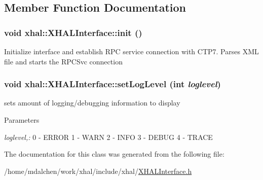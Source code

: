 \subsection{Member Function Documentation}
\hypertarget{classxhal_1_1XHALInterface_a37d127d6a407b73b9746de85d2bf5232}{
\subsubsection[{init}]{\setlength{\rightskip}{0pt plus 5cm}void xhal::XHALInterface::init ()}}
\label{classxhal_1_1XHALInterface_a37d127d6a407b73b9746de85d2bf5232}


Initialize interface and establish RPC service connection with CTP7. Parses XML file and starts the RPCSvc connection \hypertarget{classxhal_1_1XHALInterface_af04487e30a68e8d479d8ae2ad7d0fc81}{
\subsubsection[{setLogLevel}]{\setlength{\rightskip}{0pt plus 5cm}void xhal::XHALInterface::setLogLevel (int {\em loglevel})}}
\label{classxhal_1_1XHALInterface_af04487e30a68e8d479d8ae2ad7d0fc81}


sets amount of logging/debugging information to display 
\begin{DoxyParams}{Parameters}
\item[{\em loglevel,:}]0 -\/ ERROR 1 -\/ WARN 2 -\/ INFO 3 -\/ DEBUG 4 -\/ TRACE \end{DoxyParams}


The documentation for this class was generated from the following file:\begin{DoxyCompactItemize}
\item 
/home/mdalchen/work/xhal/include/xhal/\hyperlink{XHALInterface_8h}{XHALInterface.h}\end{DoxyCompactItemize}
